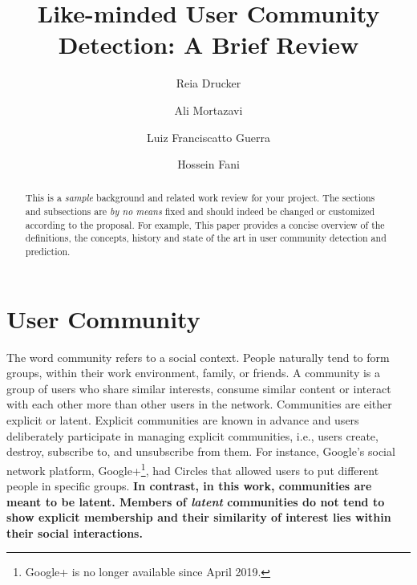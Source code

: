 \documentclass[sigconf]{acmart}
\begin{document}
\title{Like-minded User Community Detection: A Brief Review}
\author{Reia Drucker}
\author{Ali Mortazavi}
\author{Luiz Franciscatto Guerra}

\author{Hossein Fani}


\begin{abstract}
{\color{blue}This is a \textit{sample} background and related work review for your project. The sections and subsections are \textit{by no means} fixed and should indeed be changed or customized according to the proposal. For example,} This paper provides a concise overview of the definitions, the concepts, history and state of the art in user community detection and prediction.
\end{abstract}
\maketitle

\vspace{-1em}
\section{User Community}
The word community refers to a social context. People naturally tend to form groups, within their work environment, family, or friends. A community is a group of users who share similar interests, consume similar content or interact with each other more than other users in the network. Communities are either explicit or latent. Explicit communities are known in advance and users deliberately participate in managing explicit communities, i.e., users create, destroy, subscribe to, and unsubscribe from them. For instance, Google's social network platform, Google+\footnote{Google+ is no longer available since April 2019.}, had Circles that allowed users to put different people in specific groups. \textbf{In contrast, in this work, communities are meant to be latent. Members of \textit{latent} communities do not tend to show explicit membership and their similarity of interest lies within their social interactions.}
\end{document}
